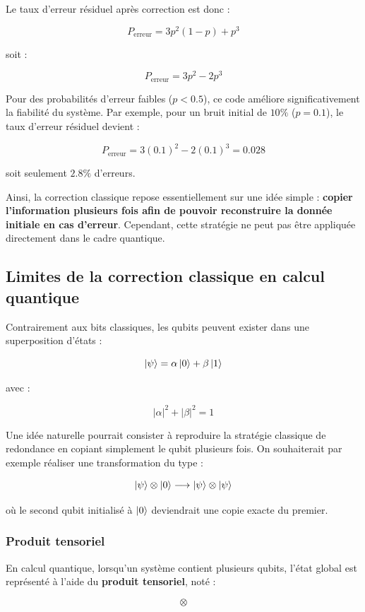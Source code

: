 \documentclass[a4paper,12pt]{article}
\begin{document}
Le taux d’erreur résiduel après correction est donc :

\[
P_{\text{erreur}}
=
3p^2(1-p)+p^3
\]

soit :

\[
P_{\text{erreur}}
=
3p^2-2p^3
\]

Pour des probabilités d’erreur faibles ($p<0.5$), ce code améliore significativement la fiabilité du système. Par exemple, pour un bruit initial de $10\%$ ($p=0.1$), le taux d’erreur résiduel devient :

\[
P_{\text{erreur}}
=
3(0.1)^2
-
2(0.1)^3
=
0.028
\]

soit seulement $2.8\%$ d’erreurs.

Ainsi, la correction classique repose essentiellement sur une idée simple : \textbf{copier l’information plusieurs fois afin de pouvoir reconstruire la donnée initiale en cas d’erreur}. Cependant, cette stratégie ne peut pas être appliquée directement dans le cadre quantique.

\subsection{Limites de la correction classique en calcul quantique}

Contrairement aux bits classiques, les qubits peuvent exister dans une superposition d’états :

\[
\ket{\psi}
=
\alpha\ket{0}
+
\beta\ket{1}
\]

avec :

\[
|\alpha|^2+|\beta|^2=1
\]

Une idée naturelle pourrait consister à reproduire la stratégie classique de redondance en copiant simplement le qubit plusieurs fois. On souhaiterait par exemple réaliser une transformation du type :

\[
\ket{\psi}
\otimes
\ket{0}
\longrightarrow
\ket{\psi}
\otimes
\ket{\psi}
\]

où le second qubit initialisé à $\ket{0}$ deviendrait une copie exacte du premier.

\subsubsection{Produit tensoriel}

En calcul quantique, lorsqu’un système contient plusieurs qubits, l’état global est représenté à l’aide du \textbf{produit tensoriel}, noté :

\[
\otimes
\]
\end{document}
